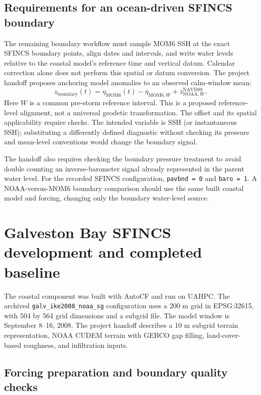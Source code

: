 \documentclass[11pt]{article}
\newcommand{\code}[1]{\texttt{#1}}
\begin{document}
\subsection{Requirements for an ocean-driven SFINCS boundary}

The remaining boundary workflow must sample MOM6 SSH at the exact SFINCS boundary points, align dates and intervals, and write water levels relative to the coastal model's reference time and vertical datum. Calendar correction alone does not perform this spatial or datum conversion. The project handoff proposes anchoring model anomalies to an observed calm-window mean:
\[
 z_{\mathrm{boundary}}(t)=\eta_{\mathrm{MOM6}}(t)-\overline{\eta}_{\mathrm{MOM6},W}
 +\overline{z}_{\mathrm{NOAA},W}^{\mathrm{NAVD88}}.
\]
Here $W$ is a common pre-storm reference interval. This is a proposed reference-level alignment, not a universal geodetic transformation. The offset and its spatial applicability require checks. The intended variable is SSH (or instantaneous SSH); substituting a differently defined diagnostic without checking its pressure and mean-level conventions would change the boundary signal.

The handoff also requires checking the boundary pressure treatment to avoid double counting an inverse-barometer signal already represented in the parent water level. For the recorded SFINCS configuration, \code{pavbnd = 0} and \code{baro = 1}. A NOAA-versus-MOM6 boundary comparison should use the same built coastal model and forcing, changing only the boundary water-level source.

\section{Galveston Bay SFINCS development and completed baseline}

The coastal component was built with AutoCF and run on UAHPC. The archived \code{galv\_ike2008\_noaa\_sg} configuration uses a 200 m grid in EPSG:32615, with 504 by 564 grid dimensions and a subgrid file. The model window is September 8--16, 2008. The project handoff describes a 10 m subgrid terrain representation, NOAA CUDEM terrain with GEBCO gap filling, land-cover-based roughness, and infiltration inputs.

\subsection{Forcing preparation and boundary quality checks}
\end{document}
